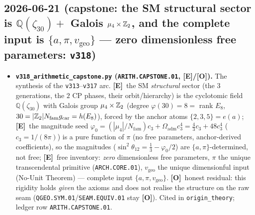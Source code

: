 \documentclass[11pt]{article}
\providecommand{\mE}{\textbf{[E]}}\providecommand{\mC}{\textbf{[C]}}
\providecommand{\mO}{\textbf{[O]}}\providecommand{\mX}{\textbf{[X]}}
\providecommand{\gcar}{g_{\mathrm{car}}}\providecommand{\Nfam}{N_{\mathrm{fam}}}
\begin{document}
\subsection*{2026-06-21 (capstone: the SM structural sector is $\mathbb Q(\zeta_{30})+$ Galois $\mu_4\times\mathbb{Z}_2$, and the complete input is $\{a,\pi,v_{\mathrm{geo}}\}$ --- zero dimensionless free parameters: \texttt{v318})}
\begin{itemize}
\item \textbf{\texttt{v318\_arithmetic\_capstone.py} (\texttt{ARITH.CAPSTONE.01}, \mE/\mO).} The synthesis of the
  \texttt{v313}--\texttt{v317} arc. \mE\ the SM \emph{structural} sector (the $3$ generations, the $2$ CP phases,
  their orbit/hierarchy) is the cyclotomic field $\mathbb Q(\zeta_{30})$ with Galois group $\mu_4\times\mathbb{Z}_2$ (degree
  $\varphi(30)=8=$ rank $E_8$, $30=|\Z_2|\Nfam\gcar=h(E_8)$), forced by the anchor atoms $\{2,3,5\}=e(a)$; \mE\ the
  magnitude seed $\varphi_0=(|\mu_4|/\Nfam)c_3+\Omega_{\mathrm{adm}}c_3^4=\tfrac43 c_3+48 c_3^4$ ($c_3=1/(8\pi)$) is a
  pure function of $\pi$ (no free parameters, anchor-derived coefficients), so the magnitudes
  ($\sin^2\theta_{12}=\tfrac13-\varphi_0/2$) are $\{a,\pi\}$-determined, not free; \mE\ free inventory: \emph{zero}
  dimensionless free parameters, $\pi$ the unique transcendental primitive (\texttt{ARCH.CORE.01}), $v_{\mathrm{geo}}$
  the unique dimensionful input (No-Unit Theorem) --- complete input $\{a,\pi,v_{\mathrm{geo}}\}$. \mO\ honest
  residual: this rigidity holds \emph{given} the axioms and does not realise the structure on the raw seam
  (\texttt{QGEO.SYM.01}/\texttt{SEAM.EQUIV.01} stay \mO). Cited in \texttt{origin\_theory}; ledger row
  \texttt{ARITH.CAPSTONE.01}.
\end{itemize}
\end{document}
